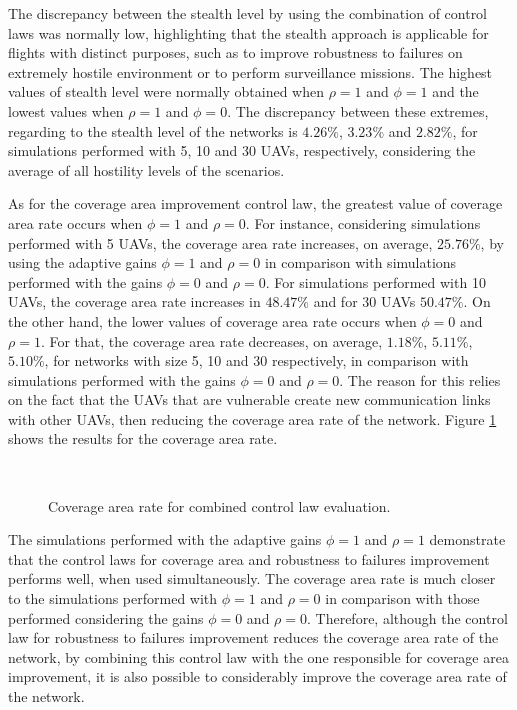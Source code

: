The discrepancy between the stealth level by using the combination of control laws was normally low, highlighting that the stealth approach is applicable for flights with distinct purposes, such as to improve robustness to failures on extremely hostile environment or to perform surveillance missions. The highest values of stealth level were normally obtained when $\rho=1$ and $\phi=1$ and the lowest values when $\rho=1$ and $\phi=0$. The discrepancy between these extremes, regarding to the stealth level of the networks is $4.26\%$, $3.23\%$ and $2.82\%$, for simulations performed with 5, 10 and 30 UAVs, respectively, considering the average of all hostility levels of the scenarios.

As for the coverage area improvement control law, the greatest value of coverage area rate occurs when $\phi=1$ and $\rho=0$. For instance, considering simulations performed with 5 UAVs, the coverage area rate increases, on average, $25.76\%$, by using the adaptive gains $\phi=1$ and $\rho=0$ in comparison with simulations performed with the gains $\phi=0$ and $\rho=0$. For simulations performed with 10 UAVs, the coverage area rate increases in $48.47\%$ and for 30 UAVs $50.47\%$. On the other hand, the lower values of coverage area rate occurs when $\phi=0$ and $\rho=1$. For that, the coverage area rate decreases, on average, $1.18\%$, $5.11\%$, $5.10\%$, for networks with size 5, 10 and 30 respectively, in comparison with simulations performed with the gains $\phi=0$ and $\rho=0$. The reason for this relies on the fact that the UAVs that are vulnerable create new communication links with other UAVs, then reducing the coverage area rate of the network. Figure \ref{fig:unstructuredCovAreaRateRadarOn} shows the results for the coverage area rate. 

\begin{figure}[hbt!]
      \centering            
         \\ \centering
      \caption{Coverage area rate for combined control law evaluation.}
      \label{fig:unstructuredCovAreaRateRadarOn}
\end{figure}

The simulations performed with the adaptive gains $\phi=1$ and $\rho=1$ demonstrate that the control laws for coverage area and robustness to failures improvement performs well, when used simultaneously. The coverage area rate is much closer to the simulations performed with $\phi=1$ and $\rho=0$ in comparison with those performed considering the gains $\phi=0$ and $\rho=0$. Therefore, although the control law for robustness to failures improvement reduces the coverage area rate of the network, by combining this control law with the one responsible for coverage area improvement, it is also possible to considerably improve the coverage area rate of the network.

